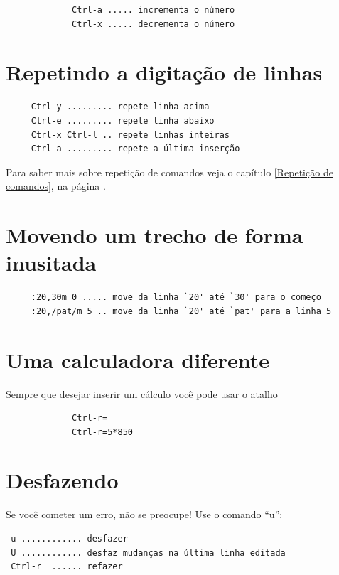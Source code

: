 \documentclass[10pt,a4paper,openany]{book}
\begin{document}
\begin{verbatim}
			 Ctrl-a ..... incrementa o número
			 Ctrl-x ..... decrementa o número
\end{verbatim}

\section{Repetindo a digitação de linhas}
\label{Repetindo a digitação de linhas}

\begin{verbatim}
	 Ctrl-y ......... repete linha acima
	 Ctrl-e ......... repete linha abaixo
	 Ctrl-x Ctrl-l .. repete linhas inteiras
	 Ctrl-a ......... repete a última inserção
\end{verbatim}

Para saber mais sobre repetição de comandos veja o capítulo \ref{Repetição de comandos},
na página \pageref{Repetição de comandos}.

\section{Movendo um trecho de forma inusitada}
\label{Movendo um trecho de forma inusitada}

\begin{verbatim}
	 :20,30m 0 ..... move da linha `20' até `30' para o começo
	 :20,/pat/m 5 .. move da linha `20' até `pat' para a linha 5
\end{verbatim}


\section{Uma calculadora diferente}
\label{Uma calculadora diferente}
Sempre que desejar inserir um cálculo você pode usar o atalho

\begin{verbatim}
			 Ctrl-r=
			 Ctrl-r=5*850
\end{verbatim}


\section{Desfazendo}
\label{Desfazendo}

Se você cometer um erro, não se preocupe! Use o comando ``u'':

\begin{verbatim}
 u ............ desfazer
 U ............ desfaz mudanças na última linha editada
 Ctrl-r  ...... refazer
\end{verbatim}
\end{document}
